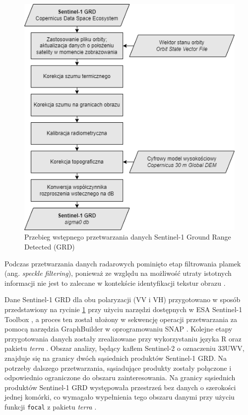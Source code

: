 \documentclass{amuthesis}
\begin{document}
\begin{figure}[t]

{\centering \includegraphics[width=4.6875in,height=\textheight]{figures/sentinel1_workflow.drawio.png}

}

\caption{\label{fig-rycina-s1-workflow}Przebieg wstępnego przetwarzania
danych Sentinel-1 Ground Range Detected (GRD)}

\end{figure}

Podczas przetwarzania danych radarowych pominięto etap filtrowania
plamek (ang. \emph{speckle filtering}), ponieważ ze względu na możliwość
utraty istotnych informacji nie jest to zalecane w kontekście
identyfikacji tekstur obrazu \autocite{filipponi_2019_s1_workflow}.

Dane Sentinel-1 GRD dla obu polaryzacji (VV i VH) przygotowano w sposób
przedstawiony na rycinie \ref{fig-rycina-s1-workflow} przy użyciu
narzędzi dostępnych w ESA Sentinel-1 Toolbox \autocite{s1tbx}, a proces
ten został ułożony w sekwencję operacji przetwarzania za pomocą
narzędzia GraphBuilder w oprogramowaniu SNAP \autocite{snap}. Kolejne
etapy przygotowania danych zostały zrealizowane przy wykorzystaniu
języka R \autocite{R-base} oraz pakietu \emph{terra} \autocite{R-terra}.
Obszar analizy, będący kaflem Sentinel-2 o oznaczeniu 33UWV, znajduje
się na granicy dwóch sąsiednich produktów Sentinel-1 GRD. Na potrzeby
dalszego przetwarzania, sąsiadujące produkty zostały połączone i
odpowiednio ograniczone do obszaru zainteresowania. Na granicy
sąsiednich produktów Sentinel-1 GRD występowała przestrzeń bez danych o
szerokości jednej komórki, co wymagało wypełnienia tego obszaru danymi
przy użyciu funkcji \texttt{focal} z pakietu \emph{terra}
\autocite{R-terra}.
\end{document}
